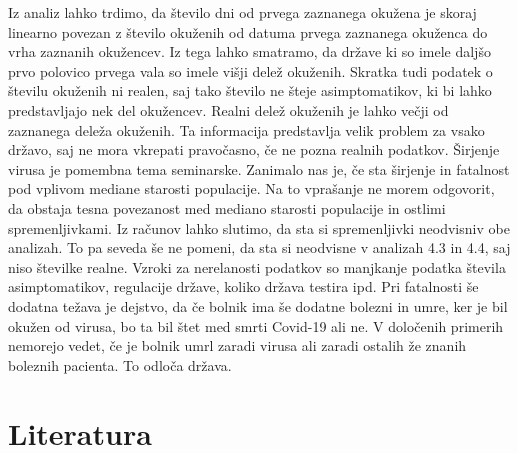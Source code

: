 \documentclass[a4paper,11pt]{article}
\begin{document}
Iz analiz lahko trdimo, da število dni od prvega zaznanega okužena je skoraj linearno povezan z število okuženih od datuma prvega zaznanega okuženca do vrha zaznanih okužencev. Iz tega lahko smatramo, da države ki so imele daljšo prvo polovico prvega vala so imele višji delež okuženih. Skratka tudi podatek o številu okuženih ni realen, saj tako število ne šteje asimptomatikov, ki bi lahko predstavljajo nek del okužencev. Realni delež okuženih je lahko večji od zaznanega deleža okuženih. Ta informacija predstavlja velik problem za vsako državo, saj ne mora vkrepati pravočasno, če ne pozna realnih podatkov. 
Širjenje virusa je pomembna tema seminarske. Zanimalo nas je, če sta širjenje in fatalnost pod vplivom mediane starosti populacije. Na to vprašanje ne morem odgovorit, da obstaja tesna povezanost med mediano starosti populacije in ostlimi spremenljivkami. Iz računov lahko slutimo, da sta si spremenljivki neodvisniv obe analizah. To pa seveda še ne pomeni, da sta si neodvisne v analizah 4.3 in 4.4, saj niso številke realne. Vzroki za nerelanosti podatkov so manjkanje podatka števila asimptomatikov, regulacije države, koliko država testira ipd. Pri fatalnosti še dodatna težava je dejstvo, da če bolnik ima še dodatne bolezni in umre, ker je bil okužen od virusa, bo ta bil štet med smrti Covid-19 ali ne. V določenih primerih nemorejo vedet, če je bolnik umrl zaradi virusa ali zaradi ostalih že znanih boleznih pacienta. To odloča država.

\section{Literatura}
\end{document}
